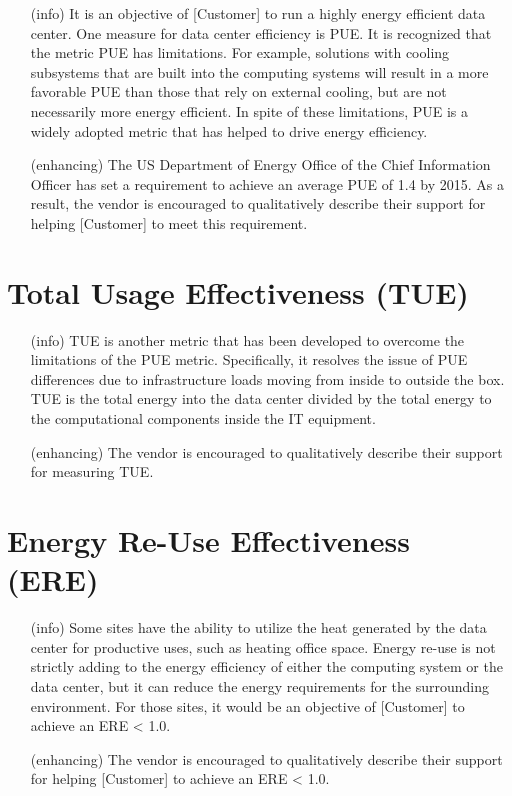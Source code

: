 \begin{itemize}

\item[(info)]
It is an objective of [Customer] to run a highly energy efficient data center.  One measure for data center efficiency is PUE.  It is recognized that the metric PUE has limitations.  For example, solutions with cooling subsystems that are built into the computing systems will result in a more favorable PUE than those that rely on external cooling, but are not necessarily more energy efficient.  In spite of these limitations, PUE is a widely adopted metric that has helped to drive energy efficiency.

\item[(enhancing)]
The US Department of Energy Office of the Chief Information Officer has set a requirement to achieve an average PUE of 1.4 by 2015.  As a result, the vendor is encouraged to qualitatively describe their support for helping [Customer] to meet this requirement.

\end{itemize}

\section{Total Usage Effectiveness (TUE)}

\begin{itemize}

\item[(info)]
TUE is another metric that has been developed to overcome the limitations of the PUE metric.  Specifically, it resolves the issue of PUE differences due to infrastructure loads moving from inside to outside the box.  TUE is the total energy into the data center divided by the total energy to the computational components inside the IT equipment.

\item[(enhancing)]
The vendor is encouraged to qualitatively describe their support for measuring TUE.
\end{itemize}

\section{Energy Re-Use Effectiveness (ERE)}

\begin{itemize}

\item[(info)]
Some sites have the ability to utilize the heat generated by the data center for productive uses, such as heating office space.  Energy re-use is not strictly adding to the energy efficiency of either the computing system or the data center, but it can reduce the energy requirements for the surrounding environment.  For those sites, it would be an objective of [Customer] to achieve an ERE < 1.0.  

\item[(enhancing)]
The vendor is encouraged to qualitatively describe their support for helping [Customer] to achieve an ERE < 1.0.  

\end{itemize}

